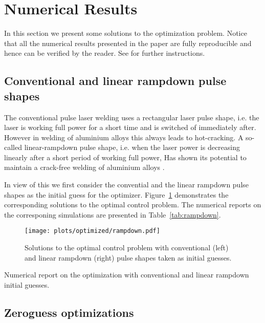\section{Numerical Results}
\label{sec:numericals}

In this section we present some solutions to the optimization problem. Notice that all the numerical results presented in the paper are fully reproducible and hence can be verified by the reader. See \cite{optcontrol_github} for further instructions. 

\subsection{Conventional and linear rampdown pulse shapes}

The conventional pulse laser welding uses a rectangular laser pulse shape, i.e. the laser is working full power for a short time and is switched of immediately after. However in welding of aluminium alloys this always leads to hot-cracking. A so-called linear-rampdown pulse shape, i.e. when the laser power is decreasing linearly after a short period of working full power, Has shown its potential to maintain a crack-free welding of aluminium alloys .

In view of this we first consider the convential and the linear rampdown pulse shapes as the initial guess for the optimizer. Figure~\ref{fig:rampdown} demonstrates the corresponding solutions to the optimal control problem. The numerical reports on the corresponing simulations are presented in Table~\ref{tab:rampdown}.

\begin{figure} \label{fig:rampdown}
	\centering
	\texttt{[image: plots/optimized/rampdown.pdf]}
	\caption{Solutions to the optimal control problem with conventional (left) and linear rampdown (right) pulse shapes taken as initial guesses.}
\end{figure}

\begin{table} \label{tab:rampdown}
	\centering
	
	\caption{Numerical report on the optimization with conventional and linear rampdown initial guesses.}
\end{table}


\subsection{Zeroguess optimizations}

